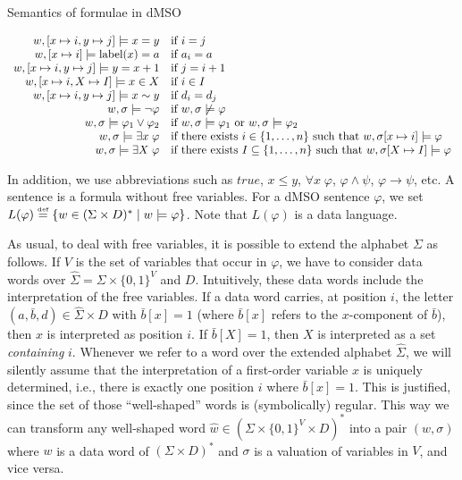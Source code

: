 \documentclass{LMCS}
\newcommand\df{\ensuremath{\mathrel{\smash{\stackrel{\scriptscriptstyle{
    \text{def}}}{=}}}}}
\newcommand{\set}[1]{\{1,\ldots,#1\}}
\newcommand{\Data}{D}
\newcommand{\mylabel}{\textup{label}}
\renewcommand{\phi}{\varphi}
\newcommand{\ttrue}{\mathit{true}}
\begin{document}
\begin{table}[tbp]
  \caption{Semantics of formulae in dMSO}
  \centering
  $\begin{array}{r @{\quad} l}
    w,[x\mapsto i,y\mapsto j]\models x=y & \text{if } i=j \\
    w,[x\mapsto i]\models \mylabel(x)=a & \text{if } a_i=a\\
    w,[x\mapsto i,y\mapsto j]\models y=x+1 & \text{if } j=i+1\\
    w,[x\mapsto i,X\mapsto I]\models x\in X & \text{if } i\in I\\
    w,[x\mapsto i,y\mapsto j]\models x\sim y & \text{if } d_i=d_j\\
    w,\sigma \models \neg \phi & \text{if } w,\sigma \not\models \phi
    \\
    w,\sigma \models \phi_1\lor \phi_2 & \text{if } w,\sigma\models
    \phi_1 \text{ or } w,\sigma\models \phi_2\\
    w,\sigma \models \exists x\; \phi & \text{if there exists }
    i\in\set{n} \text{ such that } w,\sigma[x \mapsto i]\models \phi\\
    w,\sigma \models \exists X\; \phi & \text{if there exists }
    I\subseteq\set{n} \text{ such that } w,\sigma[X \mapsto I]\models \phi
  \end{array}$
  \label{tab:semantics}
\end{table}

In addition, we use abbreviations such as $\ttrue$, $x \le y$,
$\forall x\; \phi$, $\phi \wedge \psi$, $\phi \rightarrow \psi$,
etc. A sentence is a formula without free variables. For a dMSO
sentence $\phi$, we set $L(\phi) \df \{w \in (\Sigma \times D)^\ast
\mid w \models \phi\}$. Note that $L(\phi)$ is a data language.

As usual, to deal with free variables, it is possible to extend the
alphabet $\Sigma$ as follows. If $V$ is the set of variables that
occur in $\phi$, we have to consider data words over $\hat{\Sigma} =
\Sigma \times \{0,1\}^V$ and $\Data$.  Intuitively, these data words
include the interpretation of the free variables. If a data word
carries, at position $i$, the letter $(a,\bar{b},d) \in \hat{\Sigma}
\times \Data$ with $\bar{b}[x] = 1$ (where $\bar{b}[x]$ refers to the
$x$-component of $\bar{b}$), then $x$ is interpreted as position
$i$. If $\bar{b}[X] = 1$, then $X$ is interpreted as a set
\emph{containing} $i$.  Whenever we refer to a word over the extended
alphabet $\hat{\Sigma}$, we will silently assume that the
interpretation of a first-order variable $x$ is uniquely determined,
i.e., there is exactly one position $i$ where $\bar{b}[x] = 1$. This
is justified, since the set of those ``well-shaped'' words is
(symbolically) regular. This way we can transform any well-shaped word
$\hat w\in (\Sigma \times \{0,1\}^V\times \Data)^*$ into a pair
$(w,\sigma)$ where $w$ is a data word of $(\Sigma\times \Data)^*$ and
$\sigma$ is a valuation of variables in $V$, and vice versa.
\end{document}
